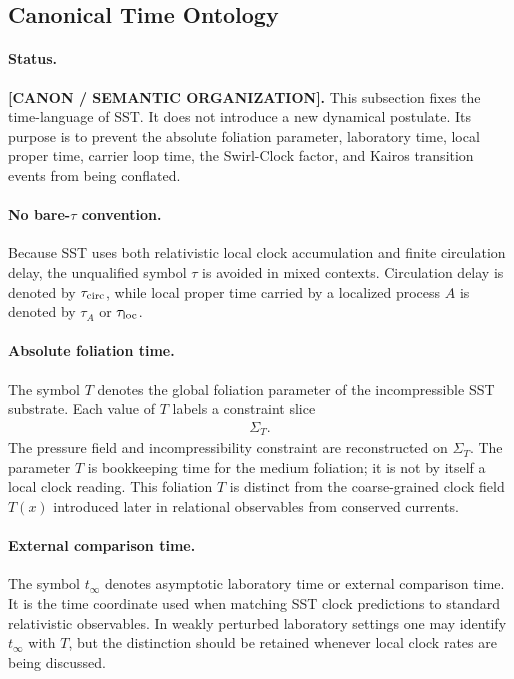 \documentclass[11pt]{article}
\theoremstyle{definition}
\theoremstyle{plain}
\theoremstyle{remark}
\begin{document}
    \subsection{Canonical Time Ontology}
        \label{subsec:canonical_time_ontology}

        \paragraph{Status.}
        \textbf{[CANON / SEMANTIC ORGANIZATION].}
        This subsection fixes the time-language of SST.  It does not introduce a
        new dynamical postulate.  Its purpose is to prevent the absolute foliation
        parameter, laboratory time, local proper time, carrier loop time, the
        Swirl-Clock factor, and Kairos transition events from being conflated.

        \paragraph{No bare-\(\tau\) convention.}
        Because SST uses both relativistic local clock accumulation and finite
        circulation delay, the unqualified symbol \(\tau\) is avoided in mixed
        contexts.  Circulation delay is denoted by
        \(\tau_{\rm circ}\), while local proper time carried by a localized
        process \(A\) is denoted by \(\tau_A\) or \(\tau_{\rm loc}\).

        \paragraph{Absolute foliation time.}
        The symbol \(T\) denotes the global foliation parameter of the
        incompressible SST substrate.  Each value of \(T\) labels a constraint
        slice
        \begin{align}
            \Sigma_T .
        \end{align}
        The pressure field and incompressibility constraint are reconstructed on
        \(\Sigma_T\).  The parameter \(T\) is bookkeeping time for the medium
        foliation; it is not by itself a local clock reading.  This foliation
        \(T\) is distinct from the coarse-grained clock field \(T(x)\) introduced
        later in relational observables from conserved currents.

        \paragraph{External comparison time.}
        The symbol \(t_{\infty}\) denotes asymptotic laboratory time or external
        comparison time.  It is the time coordinate used when matching SST clock
        predictions to standard relativistic observables.  In weakly perturbed
        laboratory settings one may identify \(t_{\infty}\) with \(T\), but the
        distinction should be retained whenever local clock rates are being
        discussed.
\end{document}

